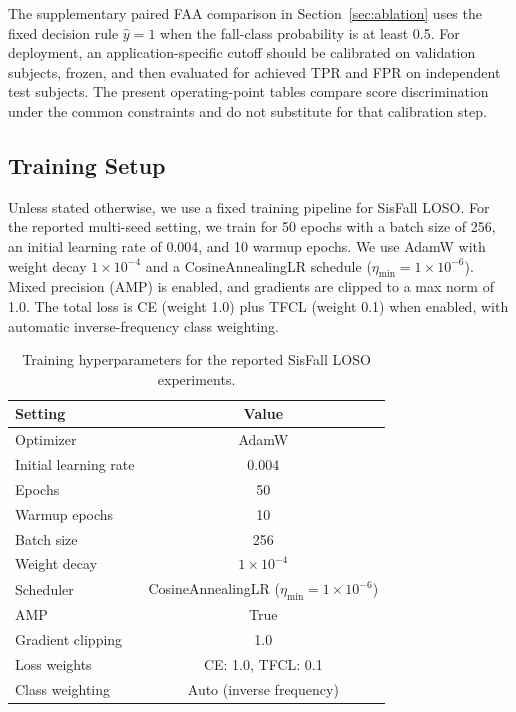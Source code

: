 \documentclass[jec]{acnsart}
\begin{document}
The supplementary paired FAA comparison in Section~\ref{sec:ablation} uses the fixed decision rule $\hat y=1$ when the fall-class probability is at least 0.5. For deployment, an application-specific cutoff should be calibrated on validation subjects, frozen, and then evaluated for achieved TPR and FPR on independent test subjects. The present operating-point tables compare score discrimination under the common constraints and do not substitute for that calibration step.

\subsection{Training Setup}

Unless stated otherwise, we use a fixed training pipeline for SisFall LOSO. For the reported multi-seed setting, we train for 50 epochs with a batch size of 256, an initial learning rate of 0.004, and 10 warmup epochs. We use AdamW with weight decay $1{\times}10^{-4}$ and a CosineAnnealingLR schedule ($\eta_{\min}{=}1{\times}10^{-6}$). Mixed precision (AMP) is enabled, and gradients are clipped to a max norm of 1.0. The total loss is CE (weight 1.0) plus TFCL (weight 0.1) when enabled, with automatic inverse-frequency class weighting.

\begin{table}[htbp]
\caption{Training hyperparameters for the reported SisFall LOSO experiments.}
\label{tab:train_setup}
\centering
\small
\setlength{\tabcolsep}{4pt}
\begin{tabular}{lc}
\toprule
Setting & Value \\
\midrule
Optimizer & AdamW \\
Initial learning rate & 0.004 \\
Epochs & 50 \\
Warmup epochs & 10 \\
Batch size & 256 \\
Weight decay & $1{\times}10^{-4}$ \\
Scheduler & CosineAnnealingLR ($\eta_{\min}{=}1{\times}10^{-6}$) \\
AMP & True \\
Gradient clipping & 1.0 \\
Loss weights & CE: 1.0, TFCL: 0.1 \\
Class weighting & Auto (inverse frequency) \\
\bottomrule
\end{tabular}
\end{table}
\end{document}
